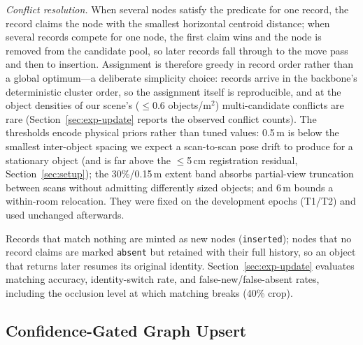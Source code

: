 \documentclass[electronics,article,accept,pdftex,moreauthors]{Definitions/mdpi}
\begin{document}
\emph{Conflict resolution.} When several nodes satisfy the predicate for one
record, the record claims the node with the smallest horizontal centroid
distance; when several records compete for one node, the first claim wins
and the node is removed from the candidate pool, so later records fall
through to the move pass and then to insertion. Assignment is therefore
greedy in record order rather than a global optimum---a deliberate
simplicity choice: records arrive in the backbone's deterministic cluster
order, so the assignment itself is reproducible, and at the object densities
of our scene's ($\le$0.6 objects/m$^2$) multi-candidate conflicts are rare
(Section~\ref{sec:exp-update} reports the observed conflict counts).
The thresholds encode physical priors rather than tuned values: 0.5\,m is
below the smallest inter-object spacing we expect a scan-to-scan pose drift
to produce for a stationary object (and is far above the $\le$5\,cm
registration residual, Section~\ref{sec:setup}); the 30\%/0.15\,m extent band
absorbs partial-view truncation between scans without admitting
differently sized objects; and 6\,m bounds a within-room relocation. They
were fixed on the development epochs (T1/T2) and used unchanged afterwards.

Records that match nothing are minted as new nodes (\texttt{inserted});
nodes that no record claims are marked \texttt{absent} but retained with
their full history, so an object that returns later resumes its original
identity. Section~\ref{sec:exp-update} evaluates matching accuracy, identity-switch rate, and
false-new/false-absent rates, including the occlusion level at which
matching breaks (40\% crop).

\subsection{Confidence-Gated Graph Upsert}
\label{sec:upsert}
\end{document}
